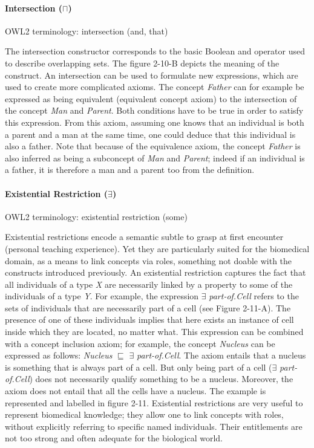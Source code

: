 \paragraph{\textbf{Intersection ($ \sqcap $)}\\}
\label{intersection}
OWL2 terminology: intersection (and, that)

The intersection constructor corresponds to the basic Boolean and operator used to describe overlapping sets. The figure 2-10-B depicts the meaning of the construct. An intersection can be used to formulate new expressions, which are used to create more complicated axioms. The concept \emph{Father} can for example be expressed as being equivalent (equivalent concept axiom) to the intersection of the concept \emph{Man} and \emph{Parent}. Both conditions have to be true in order to satisfy this expression. From this axiom, assuming one knows that an individual is both a parent and a man at the same time, one could deduce that this individual is also a father. Note that because of the equivalence axiom, the concept \emph{Father} is also inferred as being a subconcept of \emph{Man} and \emph{Parent}; indeed if an individual is a father, it is therefore a man and a parent too from the definition.

\paragraph{\textbf{Existential Restriction  ($ \exists $)}\\}
\label{exists}
OWL2 terminology: existential restriction (some)

Existential restrictions encode a semantic subtle to grasp at first encounter (personal teaching experience). Yet they are particularly suited for the biomedical domain, as a means to link concepts via roles, something not doable with the constructs introduced previously. An existential restriction captures the fact that all individuals of a type \emph{X} are necessarily linked by a property to some of the individuals of a type \emph{Y}. For example, the expression $ \exists $ \emph{part-of.Cell} refers to the sets of individuals that are necessarily part of a cell (see Figure 2-11-A). The presence of one of these individuals implies that here exists an instance of cell inside which they are located, no matter what. This expression can be combined with a concept inclusion axiom; for example, the concept \emph{Nucleus} can be expressed as follows: \emph{Nucleus} $ \sqsubseteq $ $ \exists $ \emph{part-of.Cell}. The axiom entails that a nucleus is something that is always part of a cell. But only being part of a cell ($ \exists $ \emph{part-of.Cell}) does not necessarily qualify something to be a nucleus. Moreover, the axiom does not entail that all the cells have a nucleus. The example is represented and labelled in figure 2-11. Existential restrictions are very useful to represent biomedical knowledge; they allow one to link concepts with roles, without explicitly referring to specific named individuals. Their entitlements are not too strong and often adequate for the biological world.

